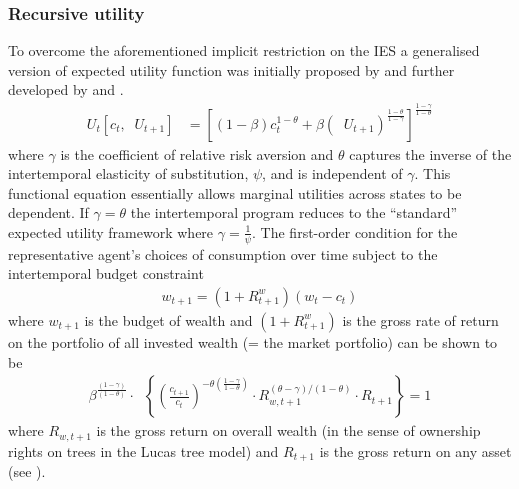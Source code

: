 \subsubsection{Recursive utility} \label{Recursive utility}
To overcome the aforementioned implicit restriction on the IES a generalised version of expected utility function was initially proposed by \citet{Kreps1978} and further developed by \citet{Epstein1989} and \citet{Weil1989}. 
\begin{align*}
    U_{t}[c_{t}, \mathop{\mathbb{E}_{t}} U_{t+1}] &= \left[(1-\beta) c_{t}^{1-\theta} + \beta(\mathop{\mathbb{E}_{t}} U_{t+1})^{\frac{1-\theta}{1-\gamma}} \right]^{\frac{1-\gamma}{1-\theta}}
\end{align*}
where $\gamma$ is the coefficient of relative risk aversion and $\theta$ captures the inverse of the intertemporal elasticity of substitution, $\psi$, and is independent of $\gamma$. This functional equation essentially allows marginal utilities across states to be dependent. If $\gamma = \theta$ the intertemporal program reduces to the ``standard'' expected utility framework where $\gamma = \frac{1}{\psi}$.
The first-order condition for the representative agent's choices of consumption over time subject to the intertemporal budget constraint 
\begin{align*}
    w_{t+1} = (1+ R_{t+1}^{w})(w_t - c_t)
\end{align*}
where $w_{t+1}$ is the budget of wealth and $(1+R_{t+1}^{w})$ is the gross rate of return on the portfolio of all invested wealth (= the market portfolio) can be shown to be
\begin{align*}
    \beta^{\frac{(1-\gamma)}{(1-\theta)}} \cdot \mathop{\mathbb{E}_{t}} \left\{ \left(\frac{c_{t+1}}{c_{t}}\right)^{-\theta \left(\frac{1-\gamma}{1-\theta}\right)} \cdot R_{w, t+1}^{(\theta-\gamma)/(1-\theta)} \cdot R_{t+1}\right\} = 1
\end{align*}
where $R_{w, t+1}$ is the gross return on overall wealth (in the sense of ownership rights on trees in the Lucas tree model) and $R_{t+1}$ is the gross return on any asset (see \citet{Constantinides2003}).

